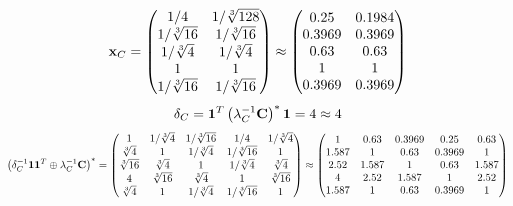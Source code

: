 \documentclass[10pt,a4paper]{article}
\begin{document}
	\[
		\bold{x}_{C} = 
		\begin{pmatrix}
			{1} / {{4}} & {1} / {\sqrt[3]{128}} \\
			{1} / {\sqrt[3]{16}} & {1} / {\sqrt[3]{16}} \\
			{1} / {\sqrt[3]{4}} & {1} / {\sqrt[3]{4}} \\
			{1}{} & {1}{} \\
			{1} / {\sqrt[3]{16}} & {1} / {\sqrt[3]{16}} \\
		\end{pmatrix}
		\approx
		\begin{pmatrix}
			0.25     & 0.1984   \\
			0.3969   & 0.3969   \\
			0.63     & 0.63     \\
			1        & 1        \\
			0.3969   & 0.3969   \\
		\end{pmatrix}
	\]
	\[
		\delta_{C} = \bold{1}^T \left(\lambda_{C}^{-1}\bold{C}\right)^* \bold{1} = {{4}}{}\approx 4
	\]
	\[
		\left(\delta_{C}^{-1}\bold{11}^T \oplus \lambda_{C}^{-1}\bold{C}\right)^* = 
		\begin{pmatrix}
			{1}{} & {1} / {\sqrt[3]{4}} & {1} / {\sqrt[3]{16}} & {1} / {{4}} & {1} / {\sqrt[3]{4}} \\
			{\sqrt[3]{4}}{} & {1}{} & {1} / {\sqrt[3]{4}} & {1} / {\sqrt[3]{16}} & {1}{} \\
			{\sqrt[3]{16}}{} & {\sqrt[3]{4}}{} & {1}{} & {1} / {\sqrt[3]{4}} & {\sqrt[3]{4}}{} \\
			{{4}}{} & {\sqrt[3]{16}}{} & {\sqrt[3]{4}}{} & {1}{} & {\sqrt[3]{16}}{} \\
			{\sqrt[3]{4}}{} & {1}{} & {1} / {\sqrt[3]{4}} & {1} / {\sqrt[3]{16}} & {1}{} \\
		\end{pmatrix}
		\approx
		\begin{pmatrix}
			1        & 0.63     & 0.3969   & 0.25     & 0.63     \\
			1.587    & 1        & 0.63     & 0.3969   & 1        \\
			2.52     & 1.587    & 1        & 0.63     & 1.587    \\
			4        & 2.52     & 1.587    & 1        & 2.52     \\
			1.587    & 1        & 0.63     & 0.3969   & 1        \\
		\end{pmatrix}
	\]
\end{document}
